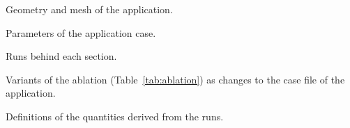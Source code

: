 \documentclass[a4paper,fleqn]{cas-sc}
\begin{document}
\begin{table}[htbp]
\caption{Geometry and mesh of the application.}\label{tab:geometry}
\footnotesize


\end{table}

\begin{table}[htbp]
\caption{Parameters of the application case.}\label{tab:parameters}
\footnotesize


\end{table}

\begin{table}[htbp]
\caption{Runs behind each section.}\label{tab:runs}
\footnotesize
\resizebox{\textwidth}{!}{}

\end{table}

\begin{table}[htbp]
\caption{Variants of the ablation (Table~\ref{tab:ablation}) as changes to the case file of the application.}\label{tab:ablationchanges}
\footnotesize


\end{table}

\begin{table}[htbp]
\caption{Definitions of the quantities derived from the runs.}\label{tab:analysis}
\footnotesize

\end{table}

\FloatBarrier



\end{document}
